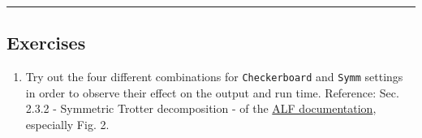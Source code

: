 \documentclass[11pt]{article}
\providecommand{\tightlist}{%
      \setlength{\itemsep}{0pt}\setlength{\parskip}{0pt}}
\begin{document}
    \begin{center}\rule{0.5\linewidth}{0.5pt}\end{center}

\hypertarget{exercises}{%
\subsection{Exercises}\label{exercises}}

\begin{enumerate}
\def\labelenumi{\arabic{enumi}.}
\tightlist
\item
  Try out the four different combinations for \texttt{Checkerboard} and
  \texttt{Symm} settings in order to observe their effect on the output
  and run time. Reference: Sec. 2.3.2 - Symmetric Trotter decomposition
  - of the
  \href{https://git.physik.uni-wuerzburg.de/ALF/ALF/-/blob/master/Documentation/doc.pdf}{ALF
  documentation}, especially Fig. 2.
\end{enumerate}


    
    
    
\end{document}
